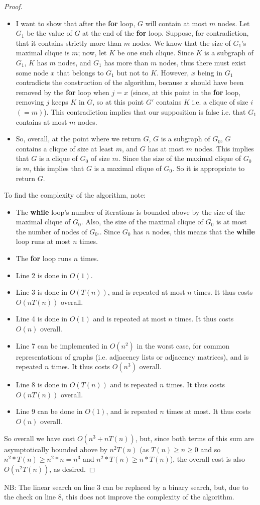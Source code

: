 \documentclass[a4paper,12pt]{scrartcl}
\begin{document}
\begin{proof}
\begin{itemize}
        \item I want to show that after the \textbf{for} loop, $G$ will contain at most $m$ nodes. Let $G_1$ be the value of $G$ at the end of the \textbf{for} loop. Suppose, for contradiction, that it contains strictly more than $m$ nodes. We know that the size of $G_1$'s maximal clique is $m$; now, let $K$ be one such clique. Since $K$ is a subgraph of $G_1$, $K$ has $m$ nodes, and $G_1$ has more than $m$ nodes, thus there must exist some node $x$ that belongs to $G_1$ but not to $K$. However, $x$ being in $G_1$ contradicts the construction of the algorithm, because $x$ should have been removed by the \textbf{for} loop when $j = x$ (since, at this point in the \textbf{for} loop, removing $j$ keeps $K$ in $G$, so at this point $G'$ contains $K$ i.e. a clique of size $i$ $(= m)$). This contradiction implies that our supposition is false i.e. that $G_1$ contains at most $m$ nodes.
        \item So, overall, at the point where we return $G$, $G$ is a subgraph of $G_0$, $G$ contains a clique of size at least $m$, and $G$ has at most $m$ nodes. This implies that $G$ is a clique of $G_0$ of size $m$. Since the size of the maximal clique of $G_0$ is $m$, this implies that $G$ is a maximal clique of $G_0$. So it is appropriate to return $G$.
    \end{itemize}
    To find the complexity of the algorithm, note:
    \begin{itemize}
        \item The \textbf{while} loop's number of iterations is bounded above by the size of the maximal clique of $G_0$. Also, the size of the maximal clique of $G_0$ is at most the number of nodes of $G_0$.. Since $G_0$ has $n$ nodes, this means that the \textbf{while} loop runs at most $n$ times.
        \item The \textbf{for} loop runs $n$ times.
        \item Line 2 is done in $O(1)$.
        \item Line 3 is done in $O(T(n))$, and is repeated at most $n$ times. It thus costs $O(n T(n))$ overall.
        \item Line 4 is done in $O(1)$ and is repeated at most $n$ times. It thus costs $O(n)$ overall.
        \item Line 7 can be implemented in $O(n^2)$ in the worst case, for common representations of graphs (i.e. adjacency lists or adjacency matrices), and is repeated $n$ times. It thus costs $O(n^3)$ overall.
        \item Line 8 is done in $O(T(n))$ and is repeated $n$ times. It thus costs $O(n T(n))$ overall.
        \item Line 9 can be done in $O(1)$, and is repeated $n$ times at most. It thus costs $O(n)$ overall.
    \end{itemize}
    So overall we have cost $O(n^3 + n T(n))$, but, since both terms of this sum are asymptotically bounded above by $n^2 T(n)$ (as $T(n) \geq n \geq 0$ and so $n^2 * T(n) \geq n^2 * n = n^3$ and $n^2 * T(n) \geq n * T(n)$), the overall cost is also $O(n^2 T(n))$, as desired.
\end{proof}

NB: The linear search on line 3 can be replaced by a binary search, but, due to the check on line 8, this does not improve the complexity of the algorithm.
\end{document}
